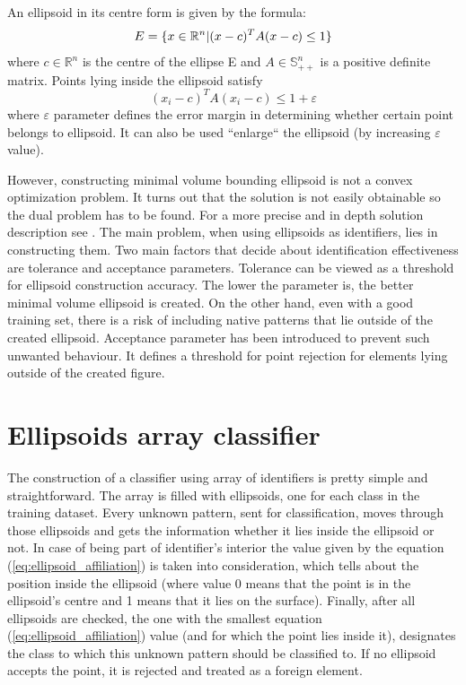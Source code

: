 An ellipsoid in its centre form is given by the formula:
\vspace{-6pt} 
\[ 
\vspace{-3pt}
E = \{x \in \mathbb{R}^{n} | (x - c)^{T}A(x-c) \le 1\} 
\vspace{-3pt}
\] 
where $c \in \mathbb{R}^{n}$ is the centre of the ellipse E and $ A \in \mathbb{S}^{n}_{++}$ is a positive definite matrix. Points lying inside the ellipsoid satisfy 
\begin{equation}\label{eq:ellipsoid_affiliation}(x_{i} - c)^{T}A(x_{i} - c) \le 1 + \varepsilon\end{equation}
where $\varepsilon$ parameter defines the error margin in determining whether certain point belongs to ellipsoid. It can also be used ``enlarge`` the ellipsoid (by increasing $\varepsilon$ value).%

However, constructing minimal volume bounding ellipsoid is not a convex optimization problem. It turns out that the solution is not easily obtainable so the dual problem has to be found. For a more precise and in depth solution description see \cite{MVEEMichaelTodd2005}. The main problem, when using ellipsoids as identifiers, lies in constructing them. Two main factors that decide about identification effectiveness are tolerance and acceptance parameters. Tolerance can be viewed as a threshold for ellipsoid construction accuracy. The lower the parameter is, the better minimal volume ellipsoid is created. On the other hand, even with a good training set, there is a risk of including native patterns that lie outside of the created ellipsoid. Acceptance parameter has been introduced to prevent such unwanted behaviour. It defines a threshold for point rejection for elements lying outside of the created figure.

\section{Ellipsoids array classifier}

The construction of a classifier using array of identifiers is pretty simple and straightforward. The array is filled with ellipsoids, one for each class in the training dataset. Every unknown pattern, sent for classification, moves through those ellipsoids and gets the information whether it lies inside the ellipsoid or not. In case of being part of identifier's interior the value given by the equation (\ref{eq:ellipsoid_affiliation}) is taken into consideration, which tells about the position inside the ellipsoid (where value 0 means that the point is in the ellipsoid's centre and 1 means that it lies on the surface). Finally, after all ellipsoids are checked, the one with the smallest equation (\ref{eq:ellipsoid_affiliation}) value (and for which the point lies inside it), designates the class to which this unknown pattern should be classified to. If no ellipsoid accepts the point, it is rejected and treated as a foreign element. 

